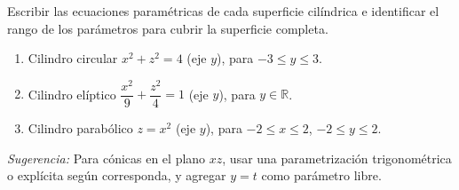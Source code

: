 Escribir las ecuaciones paramétricas de cada superficie cilíndrica e identificar el rango de los parámetros para cubrir la superficie completa.
\begin{enumerate}
    \item Cilindro circular $x^2 + z^2 = 4$ (eje $y$), para $-3 \leq y \leq 3$.
    \item Cilindro elíptico $\dfrac{x^2}{9} + \dfrac{z^2}{4} = 1$ (eje $y$), para $y \in \mathbb{R}$.
    \item Cilindro parabólico $z = x^2$ (eje $y$), para $-2 \leq x \leq 2$, $-2 \leq y \leq 2$.
\end{enumerate}

\textit{Sugerencia:} Para cónicas en el plano $xz$, usar una parametrización trigonométrica o explícita según corresponda, y agregar $y = t$ como parámetro libre.